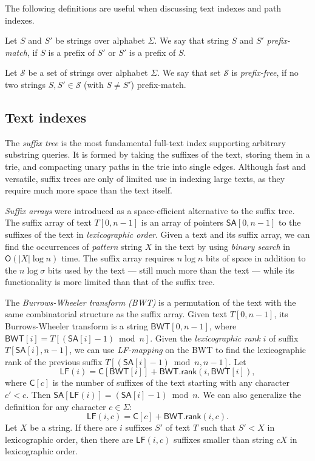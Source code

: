 \documentclass[a4paper,UKenglish]{lipics-v2016}
\newcommand{\abs}[1]{\ensuremath{\lvert #1 \rvert}}
\newcommand{\Oh}[1]{\ensuremath{\mathsf{O}\!\left( #1 \right)}}
\newcommand{\rank}{\ensuremath{\mathsf{rank}}}
\newcommand{\LF}{\ensuremath{\mathsf{LF}}}
\newcommand{\LFmapping}{LF\nobreakdash-mapping}
\newcommand{\SA}{\ensuremath{\mathsf{SA}}}
\newcommand{\BWT}{\ensuremath{\mathsf{BWT}}}
\newcommand{\Carray}{\ensuremath{\mathsf{C}}}
\begin{document}
The following definitions are useful when discussing text indexes and path indexes.

\begin{definition}
Let $S$ and $S'$ be strings over alphabet $\Sigma$. We say that string $S$ and $S'$ \emph{prefix-match}, if $S$ is a prefix of $S'$ or $S'$ is a prefix of $S$.
\end{definition}

\begin{definition}
Let $\mathcal{S}$ be a set of strings over alphabet $\Sigma$. We say that set $\mathcal{S}$ is \emph{prefix-free}, if no two strings $S, S' \in \mathcal{S}$ (with $S \ne S'$) prefix-match.
\end{definition}

\subsection{Text indexes}

The \emph{suffix tree} \cite{Weiner1973} is the most fundamental full-text index supporting arbitrary substring queries. It is formed by taking the suffixes of the text, storing them in a trie, and compacting unary paths in the trie into single edges. Although fast and versatile, suffix trees are only of limited use in indexing large texts, as they require much more space than the text itself.

\emph{Suffix arrays} \cite{Manber1993} were introduced as a space-efficient alternative to the suffix tree. The suffix array of text $T[0, n-1]$ is an array of pointers $\SA[0, n-1]$ to the suffixes of the text in \emph{lexicographic order}. Given a text and its suffix array, we can find the occurrences of \emph{pattern} string $X$ in the text by using \emph{binary search} in $\Oh{\abs{X} \log n}$ time. The suffix array requires $n \log n$ bits of space in addition to the $n \log \sigma$ bits used by the text --- still much more than the text --- while its functionality is more limited than that of the suffix tree.

The \emph{Burrows-Wheeler transform (BWT)} \cite{Burrows1994} is a permutation of the text with the same combinatorial structure as the suffix array. Given text $T[0, n-1]$, its Burrows-Wheeler transform is a string $\BWT[0, n-1]$, where $\BWT[i] = T[(\SA[i]-1) \bmod n]$. Given the \emph{lexicographic rank} $i$ of suffix $T[\SA[i], n-1]$, we can use \emph{\LFmapping} on the BWT to find the lexicographic rank of the previous suffix $T[(\SA[i]-1) \bmod n, n-1]$. Let
$$
\LF(i) = \Carray[\BWT[i]] + \BWT.\rank(i, \BWT[i]),
$$
where $\Carray[c]$ is the number of suffixes of the text starting with any character $c' < c$. Then $\SA[\LF(i)] = (\SA[i]-1) \bmod n$. We can also generalize the definition for any character $c \in \Sigma$:
$$
\LF(i, c) = \Carray[c] + \BWT.\rank(i, c).
$$
Let $X$ be a string. If there are $i$ suffixes $S'$ of text $T$ such that $S' < X$ in lexicographic order, then there are $\LF(i, c)$ suffixes smaller than string $cX$ in lexicographic order.
\end{document}

